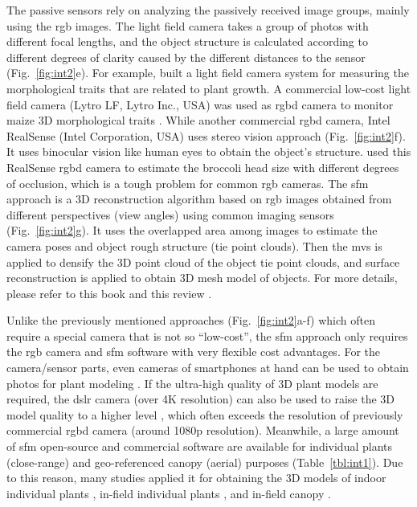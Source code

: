 The passive sensors rely on analyzing the passively received image groups, mainly using the \gls{rgb} images. The light field camera takes a group of photos with different focal lengths, and the object structure is calculated according to different degrees of clarity caused by the different distances to the sensor (Fig.~\ref{fig:int2}e). For example, \citet{apelt_phytotyping_2015} built a light field camera system for measuring the morphological traits that are related to plant growth. A commercial low-cost light field camera (Lytro LF, Lytro Inc., USA) was used as \gls{rgbd} camera to monitor maize 3D morphological traits \citep{schima_imagine_2016}. While another commercial \gls{rgbd} camera, Intel RealSense (Intel Corporation, USA) uses stereo vision approach (Fig.~\ref{fig:int2}f). It uses binocular vision like human eyes to obtain the object's structure. \citet{blok_image_2021} used this RealSense \gls{rgbd} camera to estimate the broccoli head size with different degrees of occlusion, which is a tough problem for common \gls{rgb} cameras. The \gls{sfm} approach is a 3D reconstruction algorithm based on \gls{rgb} images obtained from different perspectives (view angles) using common imaging sensors (Fig.~\ref{fig:int2}g). It uses the overlapped area among images to estimate the camera poses and object rough structure (tie point clouds). Then the \gls{mvs} is applied to densify the 3D point cloud of the object tie point clouds, and surface reconstruction is applied to obtain 3D mesh model of objects. For more details, please refer to this book \citep{hartley_multiple_2000} and this review \citep{snavely_scene_2010}. 

Unlike the previously mentioned approaches (Fig.~\ref{fig:int2}a-f) which often require a special camera that is not so ``low-cost'', the \gls{sfm} approach only requires the \gls{rgb} camera and \gls{sfm} software with very flexible cost advantages. For the camera/sensor parts, even cameras of smartphones at hand can be used to obtain photos for plant modeling \citep{li_measuring_2020}. If the ultra-high quality of 3D plant models are required, the \gls{dslr} camera (over 4K resolution) can also be used to raise the 3D model quality to a higher level \citep{nguyen_3d_2016, drofova_use_2023}, which often exceeds the resolution of previously commercial \gls{rgbd} camera (around 1080p resolution). Meanwhile, a large amount of \gls{sfm} open-source and commercial software are available for individual plants (close-range) and geo-referenced canopy (aerial) purposes (Table~\ref{tbl:int1}). Due to this reason, many studies applied it for obtaining the 3D models of indoor individual plants \citep{wu_mvs-pheno_2020, zhou_automated_2019}, in-field individual plants \citep{jay_field_2015, herrero_structural_2023}, and in-field canopy \citep{kim_modeling_2018, herrero_canopy_2020}.

